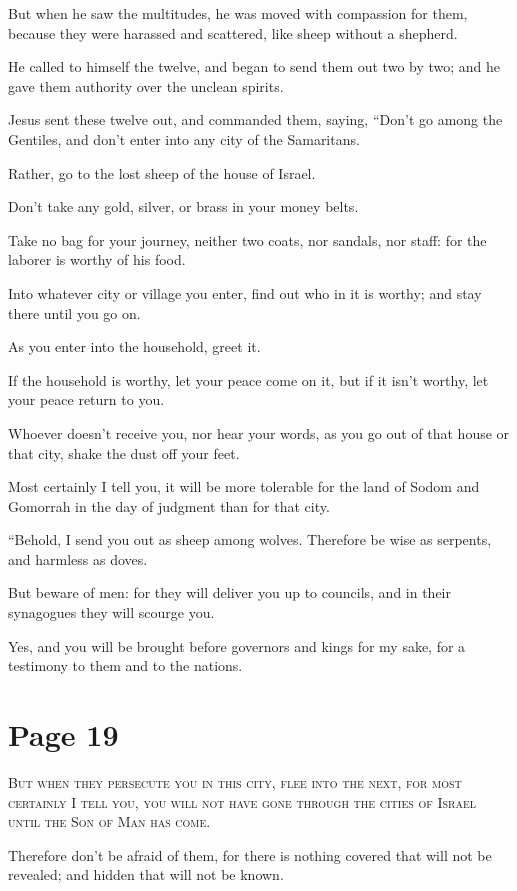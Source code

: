 But when he saw the multitudes, he was moved with compassion for them, because they were harassed and scattered, like sheep without a shepherd.

He called to himself the twelve, and began to send them out two by two; and he gave them authority over the unclean spirits.

Jesus sent these twelve out, and commanded them, saying, “Don’t go among the Gentiles, and don’t enter into any city of the Samaritans.

Rather, go to the lost sheep of the house of Israel.

Don’t take any gold, silver, or brass in your money belts.

Take no bag for your journey, neither two coats, nor sandals, nor staff: for the laborer is worthy of his food.

Into whatever city or village you enter, find out who in it is worthy; and stay there until you go on.

As you enter into the household, greet it.

If the household is worthy, let your peace come on it, but if it isn’t worthy, let your peace return to you.

Whoever doesn’t receive you, nor hear your words, as you go out of that house or that city, shake the dust off your feet.

Most certainly I tell you, it will be more tolerable for the land of Sodom and Gomorrah in the day of judgment than for that city.

“Behold, I send you out as sheep among wolves. Therefore be wise as serpents, and harmless as doves.

But beware of men: for they will deliver you up to councils, and in their synagogues they will scourge you.

Yes, and you will be brought before governors and kings for my sake, for a testimony to them and to the nations.



\chapterornament
\section*{Page 19}

\lettrine{B}{ut when they persecute you in this city, flee into the next, for most certainly I tell you, you will not have gone through the cities of Israel until the Son of Man has come.}

Therefore don’t be afraid of them, for there is nothing covered that will not be revealed; and hidden that will not be known.

